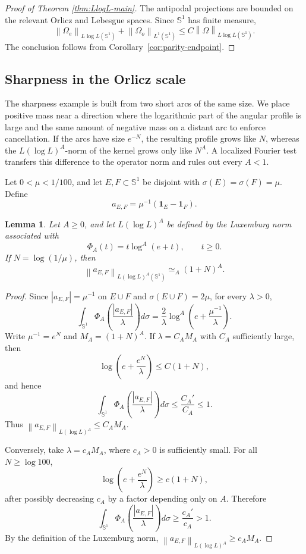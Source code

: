 \documentclass[11pt]{amsart}
\newtheorem{lemma}[definition]{Lemma}
\theoremstyle{remark}
\numberwithin{equation}{section}
\newcommand{\Sph}{\mathbb S^1}
\newcommand{\norm}[1]{\left\lVert #1\right\rVert}
\newcommand{\one}{\mathbf 1}
\begin{document}
	\begin{proof}[Proof of Theorem \ref{thm:LlogL-main}]
		The antipodal projections are bounded on the relevant Orlicz and Lebesgue
		spaces. Since \(\Sph\) has finite measure,
		\[
		\norm{\Omega_e}_{L\log L(\Sph)}
		+
		\norm{\Omega_o}_{L^1(\Sph)}
		\le
		C\norm{\Omega}_{L\log L(\Sph)}.
		\]
		The conclusion follows from Corollary~\ref{cor:parity-endpoint}.
	\end{proof}
	
	\subsection{Sharpness in the Orlicz scale}
	
	The sharpness example is built from two short arcs of the same size.  We place
	positive mass near a direction where the logarithmic part of the angular
	profile is large and the same amount of negative mass on a distant arc to
	enforce cancellation.  If the arcs have size \(e^{-N}\), the resulting profile
	grows like \(N\), whereas the \(L(\log L)^A\)-norm of the kernel grows only like
	\(N^A\).  A localized Fourier test transfers this difference to the operator
	norm and rules out every \(A<1\).
	
	Let \(0<\mu<1/100\), and let \(E,F\subset \Sph\) be disjoint with
	\(\sigma(E)=\sigma(F)=\mu\).  Define
	\[
	a_{E,F}=\mu^{-1}(\one_E-\one_F).
	\]
	
	\begin{lemma}\label{lem:orlicz-atom}
		Let \(A\ge0\), and let \(L(\log L)^A\) be defined by the Luxemburg norm
		associated with
		\[
		\Phi_A(t)=t\log^A(e+t),\qquad t\ge0.
		\]
		If \(N=\log(1/\mu)\), then
		\[
		\norm{a_{E,F}}_{L(\log L)^A(\Sph)}
		\simeq_A (1+N)^A.
		\]
	\end{lemma}
	
	\begin{proof}
		Since \(|a_{E,F}|=\mu^{-1}\) on \(E\cup F\) and
		\(\sigma(E\cup F)=2\mu\), for every \(\lambda>0\),
		\[
		\int_{\Sph}
		\Phi_A\left(\frac{|a_{E,F}|}{\lambda}\right)d\sigma
		=
		\frac2\lambda
		\log^A\left(e+\frac{\mu^{-1}}{\lambda}\right).
		\]
		Write \(\mu^{-1}=e^N\) and \(M_A=(1+N)^A\).  If
		\(\lambda=C_AM_A\) with \(C_A\) sufficiently large, then
		\[
		\log\left(e+\frac{e^N}{\lambda}\right)\le C(1+N),
		\]
		and hence
		\[
		\int_{\Sph}
		\Phi_A\left(\frac{|a_{E,F}|}{\lambda}\right)d\sigma
		\le
		\frac{C_A'}{C_A}\le1.
		\]
		Thus \(\norm{a_{E,F}}_{L(\log L)^A}\le C_AM_A\).
		
		Conversely, take \(\lambda=c_AM_A\), where \(c_A>0\) is sufficiently small.
		For all \(N\ge\log 100\),
		\[
		\log\left(e+\frac{e^N}{\lambda}\right)\ge c(1+N),
		\]
		after possibly decreasing \(c_A\) by a factor depending only on \(A\).
		Therefore
		\[
		\int_{\Sph}
		\Phi_A\left(\frac{|a_{E,F}|}{\lambda}\right)d\sigma
		\ge
		\frac{c_A'}{c_A}>1.
		\]
		By the definition of the Luxemburg norm,
		\(\norm{a_{E,F}}_{L(\log L)^A}\ge c_AM_A\).
	\end{proof}
	
\end{document}
